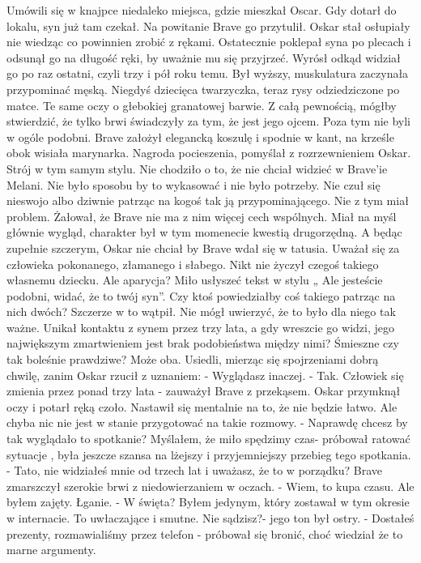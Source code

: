 \documentclass[12pt,a4paper]{book}
\begin{document}
Umówili się w knajpce niedaleko miejsca, gdzie mieszkał Oscar. Gdy dotarł do lokalu, syn już tam czekał. Na powitanie Brave go przytulił. Oskar stał osłupiały nie wiedząc co powinnien zrobić z rękami. Ostatecznie poklepał syna po plecach i odsunął go na długość ręki, by uważnie mu się przyjrzeć. Wyrósł odkąd widział go po raz ostatni, czyli trzy i pół roku temu. Był wyższy, muskulatura zaczynała przypominać męską. Niegdyś dziecięca twarzyczka, teraz rysy odziedziczone po matce. Te same oczy o głebokiej granatowej barwie. Z całą pewnością, mógłby stwierdzić, że tylko brwi świadczyły za tym, że jest jego ojcem. Poza tym nie byli w ogóle podobni. Brave założył elegancką koszulę i spodnie w kant, na krześle obok wisiała marynarka. Nagroda pocieszenia, pomyślał z rozrzewnieniem Oskar. Strój w tym samym stylu. 
Nie chodziło o to, że nie chciał widzieć w Brave’ie Melani. Nie było sposobu by to wykasować i nie było potrzeby. Nie czuł się nieswojo albo dziwnie patrząc na kogoś tak ją przypominającego. Nie z tym miał problem. Żałował, że Brave nie ma z nim więcej cech wspólnych. Miał na myśl głównie wygląd, charakter był w tym momenecie kwestią drugorzędną. A będąc zupełnie szczerym, Oskar nie chciał by Brave wdał się w tatusia. Uważał się za człowieka pokonanego, złamanego i słabego. Nikt nie życzył czegoś takiego własnemu  dziecku. Ale aparycja? Miło usłyszeć tekst  w stylu „ Ale jesteście podobni, widać, że to twój syn”. Czy ktoś powiedziałby coś takiego patrząc na nich dwóch? Szczerze w to wątpił. Nie mógł uwierzyć, że to było dla niego tak ważne. Unikał kontaktu z synem przez trzy lata, a gdy wreszcie go widzi, jego największym zmartwieniem jest brak podobieństwa między nimi? Śmieszne czy tak boleśnie prawdziwe? Może oba. 
Usiedli, mierząc się spojrzeniami dobrą chwilę, zanim Oskar rzucił z uznaniem:
- Wyglądasz inaczej.
- Tak. Człowiek się zmienia przez ponad trzy lata - zauważył Brave z przekąsem. 
Oskar przymknął oczy i potarł ręką czoło. Nastawił się mentalnie na to, że nie będzie łatwo. Ale chyba nic nie jest w stanie przygotować na takie rozmowy.
- Naprawdę chcesz by tak wyglądało to spotkanie? Myślałem, że miło spędzimy czas- próbował ratować sytuacje , była jeszcze szansa na lżejszy i przyjemniejszy przebieg tego spotkania.
- Tato, nie widziałeś mnie od trzech lat i uważasz, że to w porządku? Brave zmarszczył szerokie brwi z niedowierzaniem w oczach.
- Wiem, to kupa czasu. Ale byłem zajęty. 
Łganie. 
- W święta? Byłem jedynym, który zostawał w tym okresie w internacie. To uwłaczające i smutne. Nie sądzisz?- jego ton był ostry.
- Dostałeś prezenty, rozmawialiśmy przez telefon - próbował się bronić, choć wiedział że to marne argumenty. 
\end{document}
